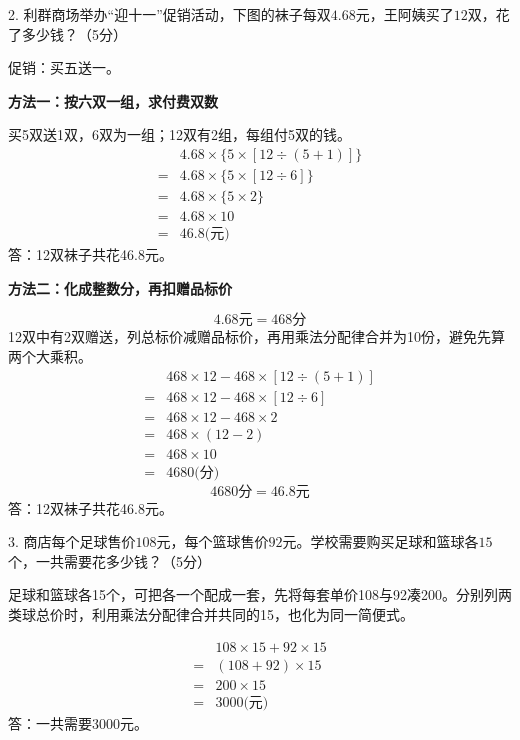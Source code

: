 2. 利群商场举办“迎十一”促销活动，下图的袜子每双\(4.68\)元，王阿姨买了\(12\)双，花了多少钱？（5分）\par 促销：买五送一。\par
{}
\begin{BookAnswer}
\textbf{方法一：按六双一组，求付费双数}\par 买5双送1双，6双为一组；12双有2组，每组付5双的钱。\[\begin{aligned}&4.68\times\{5\times[12\div(5+1)]\}\\={}&4.68\times\{5\times[12\div6]\}\\={}&4.68\times\{5\times2\}\\={}&4.68\times10\\={}&46.8\text{(元)}\end{aligned}\]答：12双袜子共花46.8元。\par \textbf{方法二：化成整数分，再扣赠品标价}\par \[4.68\text{元}=468\text{分}\]12双中有2双赠送，列总标价减赠品标价，再用乘法分配律合并为10份，避免先算两个大乘积。\[\begin{aligned}&468\times12-468\times[12\div(5+1)]\\={}&468\times12-468\times[12\div6]\\={}&468\times12-468\times2\\={}&468\times(12-2)\\={}&468\times10\\={}&4680\text{(分)}\end{aligned}\]\[4680\text{分}=46.8\text{元}\]答：12双袜子共花46.8元。
\end{BookAnswer}

3. 商店每个足球售价\(108\)元，每个篮球售价\(92\)元。学校需要购买足球和篮球各\(15\)个，一共需要花多少钱？（5分）\par
\begin{BookAnswer}
足球和篮球各15个，可把各一个配成一套，先将每套单价108与92凑200。分别列两类球总价时，利用乘法分配律合并共同的15，也化为同一简便式。\par \[\begin{aligned}&108\times15+92\times15\\={}&(108+92)\times15\\={}&200\times15\\={}&3000\text{(元)}\end{aligned}\]答：一共需要3000元。
\end{BookAnswer}

